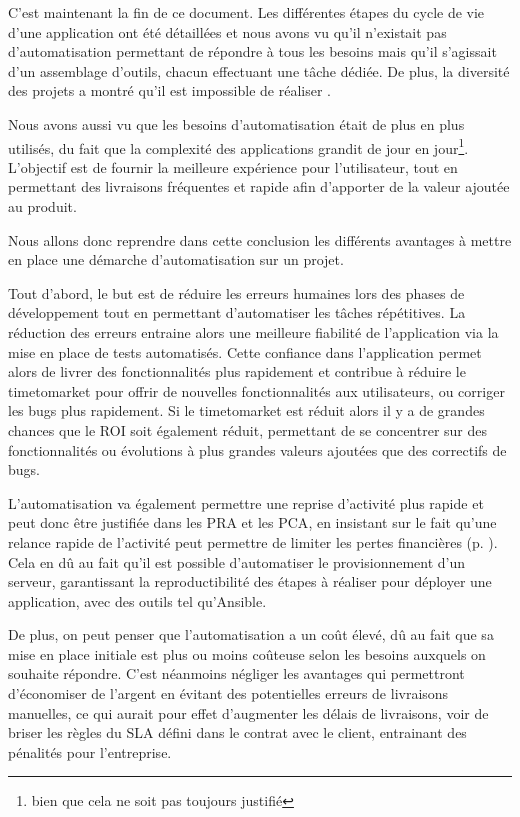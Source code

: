 C'est maintenant la fin de ce document. Les différentes étapes du cycle de vie d'une application ont été détaillées et nous avons vu qu'il n'existait pas d'automatisation  permettant de répondre à tous les besoins mais qu'il s'agissait d'un assemblage d'outils, chacun effectuant une tâche dédiée. De plus, la diversité des projets a montré qu'il est impossible de réaliser .

Nous avons aussi vu que les besoins d'automatisation était de plus en plus utilisés, du fait que la complexité des applications grandit de jour en jour\footnote{bien que cela ne soit pas toujours justifié}. L'objectif est de fournir la meilleure expérience pour l'utilisateur, tout en permettant des livraisons fréquentes et rapide afin d'apporter de la valeur ajoutée au produit.

Nous allons donc reprendre dans cette conclusion les différents avantages à mettre en place une démarche d'automatisation sur un projet.

Tout d'abord, le but est de réduire les erreurs humaines lors des phases de développement tout en permettant d'automatiser les tâches répétitives. La réduction des erreurs entraine alors une meilleure fiabilité de l'application via la mise en place de tests automatisés. Cette confiance dans l'application permet alors de livrer des fonctionnalités plus rapidement et contribue à réduire le \gls{timetomarket} pour offrir de nouvelles fonctionnalités aux utilisateurs, ou corriger les bugs plus rapidement. Si le \gls{timetomarket} est réduit alors il y a de grandes chances que le \gls{ROI} soit également réduit, permettant de se concentrer sur des fonctionnalités ou évolutions à plus grandes valeurs ajoutées que des correctifs de bugs.

L'automatisation va également permettre une reprise d'activité plus rapide et peut donc être justifiée dans les \gls{PRA} et les \gls{PCA}, en insistant sur le fait qu'une relance rapide de l'activité peut permettre de limiter les pertes financières (p. \pageref{ref-pra}). Cela en dû au fait qu'il est possible d'automatiser le provisionnement d'un serveur, garantissant la reproductibilité des étapes à réaliser pour déployer une application, avec des outils tel qu'Ansible.

De plus, on peut penser que l'automatisation a un coût élevé, dû au fait que sa mise en place initiale est plus ou moins coûteuse selon les besoins auxquels on souhaite répondre. C'est néanmoins négliger les avantages qui permettront d'économiser de l'argent en évitant des potentielles erreurs de livraisons manuelles, ce qui aurait pour effet d'augmenter les délais de livraisons, voir de briser les règles du \gls{SLA} défini dans le contrat avec le client, entrainant des pénalités pour l'entreprise.

